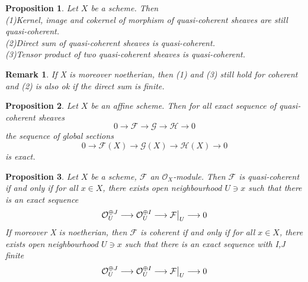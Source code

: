 \documentclass{ctexart}
\newtheorem{remark}{Remark}[section]
\newtheorem{proposition}{Proposition}[section]
\begin{document}
\begin{proposition}
    Let $X$ be a scheme.
    Then \\
    (1)Kernel, image and cokernel of morphism of quasi-coherent sheaves are still quasi-coherent. \\
    (2)Direct sum of quasi-coherent sheaves is quasi-coherent. \\
    (3)Tensor product of two quasi-coherent sheaves is quasi-coherent.
    \label{Proposition 6.3}
\end{proposition}
\begin{remark}
    If X is moreover noetherian, then (1) and (3) still hold for coherent and (2) is also ok if the direct sum is finite.
\end{remark}
\begin{proposition}
    Let $X$ be an affine scheme.
    Then for all exact sequence of quasi-coherent sheaves 
    \begin{equation*}
        0 \longrightarrow \mathcal{F} \longrightarrow \mathcal{G} \longrightarrow \mathcal{H} \longrightarrow 0
    \end{equation*}
    the sequence of global sections 
    \begin{equation*}
        0 \longrightarrow \mathcal{F}(X) \longrightarrow \mathcal{G}(X) \longrightarrow \mathcal{H}(X) \longrightarrow 0
    \end{equation*}
    is exact.
    \label{Proposition 6.4}
\end{proposition}
\begin{proposition}
    Let $X$ be a scheme, $\mathcal{F}$ an $\mathcal{O}_{X}$-module.
    Then $\mathcal{F}$ is quasi-coherent if and only if for all $x\in X$, 
    there exists open neighbourhood $U\ni x$ such that there is an exact sequence
    \begin{equation*}
        \mathcal{O}_{U}^{\oplus J} \longrightarrow \mathcal{O}_{U}^{\oplus I} \longrightarrow \mathcal{F}\big{|}_{U} \longrightarrow 0
    \end{equation*}
    If moreover X is noetherian,
    then $\mathcal{F}$ is coherent if and only if for all $x\in X$, 
    there exists open neighbourhood $U\ni x$ such that there is an exact sequence with I,J finite
    \begin{equation*}
        \mathcal{O}_{U}^{\oplus J} \longrightarrow \mathcal{O}_{U}^{\oplus I} \longrightarrow \mathcal{F}\big{|}_{U} \longrightarrow 0
    \end{equation*}
    \label{Proposition 6.5}
\end{proposition}
\end{document}
